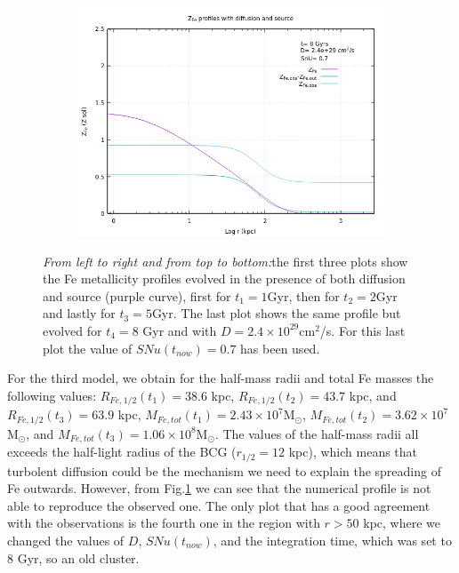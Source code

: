 \documentclass{article}
\begin{document}
\begin{figure}[H]
\begin{subfigure}{0.49\textwidth}
	\end{subfigure}
	\begin{subfigure}{0.49\textwidth}
		\includegraphics[width=0.9\linewidth]{Z_diffsource_8.png}
	\end{subfigure}
	\caption{\textit{From left to right and from top to bottom:}the first three plots show the Fe metallicity profiles evolved in the presence of both diffusion and source (purple curve), first for $t_{1}=1$Gyr, then for $t_{2}=2$Gyr and lastly for $t_{3}=5$Gyr. The last plot shows the same profile but evolved for $t_{4}=8$ Gyr and with $D=2.4\times 10^{29}$cm$^{2}$/s. For this last plot the value of $SNu(t_{now})=0.7$ has been used.}
	\label{fig:Zdiffsource}
\end{figure}
For the third model, we obtain for the half-mass radii and total Fe masses the following values: $R_{Fe,1/2}(t_{1})=38.6$ kpc, $R_{Fe,1/2}(t_{2})=43.7$ kpc, and $R_{Fe,1/2}(t_{3})=63.9$ kpc,
$M_{Fe,tot}(t_{1})=2.43\times10^{7}$M$_{\odot}$, $M_{Fe,tot}(t_{2})=3.62\times10^{7}$M$_{\odot}$, and $M_{Fe,tot}(t_{3})=1.06\times10^{8}$M$_{\odot}$.
The values of the half-mass radii all exceeds the half-light radius of the BCG ($r_{1/2}=12$ kpc), which means that turbolent diffusion could be the mechanism we need to explain the spreading of Fe outwards. However, from Fig.\ref{fig:Zdiffsource} we can see that the numerical profile is not able to reproduce the observed one. The only plot that has a good agreement with the observations is the fourth one in the region with $r>50$ kpc, where we changed the values of $D$, $SNu(t_{now})$, and the integration time, which was set to $8$ Gyr, so an old cluster.
\end{document}
